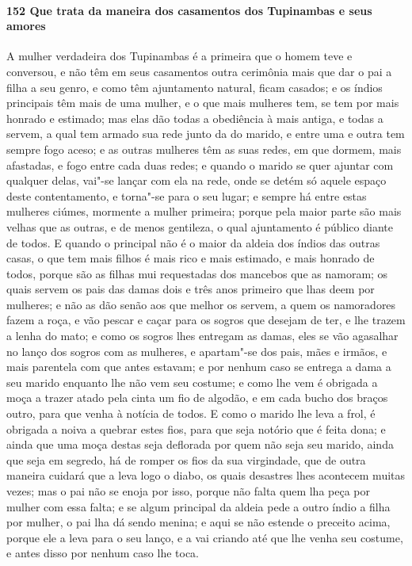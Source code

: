 \paragraph{152 Que trata da maneira dos casamentos dos Tupinambas e seus amores}

A mulher verdadeira dos Tupinambas é a primeira que o homem teve e conversou, e não têm em
seus casamentos outra cerimônia mais que dar o pai a filha a seu genro, e como têm
ajuntamento natural, ficam casados; e os índios principais têm mais de uma mulher, e o que
mais mulheres tem, se tem por mais honrado e estimado; mas elas dão todas a obediência à
mais antiga, e todas a servem, a qual tem armado sua rede junto da do marido, e entre uma
e outra tem sempre fogo aceso; e as outras mulheres têm as suas redes, em que dormem, mais
afastadas, e fogo entre cada duas redes; e quando o marido se quer ajuntar com qualquer
delas, vai"-se lançar com ela na rede, onde se detém só aquele espaço deste contentamento,
e torna"-se para o seu lugar; e sempre há entre estas mulheres ciúmes, mormente a mulher
primeira; porque pela maior parte são mais velhas que as outras, e de menos gentileza, o
qual ajuntamento é público diante de todos. E quando o principal não é o maior da aldeia
dos índios das outras casas, o que tem mais filhos é mais rico e mais estimado, e mais
honrado de todos, porque são as filhas mui requestadas dos mancebos que as namoram; os
quais servem os pais das damas dois e três anos primeiro que lhas deem por mulheres; e não
as dão senão aos que melhor os servem, a quem os namoradores fazem a roça, e vão pescar e
caçar para os sogros que desejam de ter, e lhe trazem a lenha do mato; e como os sogros
lhes entregam as damas, eles se vão agasalhar no lanço dos sogros com as mulheres, e
apartam"-se dos pais, mães e irmãos, e mais parentela com que antes estavam; e por nenhum
caso se entrega a dama a seu marido enquanto lhe não vem seu costume; e como lhe vem é
obrigada a moça a trazer atado pela cinta um fio de algodão, e em cada bucho dos braços
outro, para que venha à notícia de todos. E como o marido lhe leva a frol, é obrigada a
noiva a quebrar estes fios, para que seja notório que é feita dona; e ainda que uma moça
destas seja deflorada por quem não seja seu marido, ainda que seja em segredo, há de
romper os fios da sua virgindade, que de outra maneira cuidará que a leva logo o diabo, os
quais desastres lhes acontecem muitas vezes; mas o pai não se enoja por isso, porque não
falta quem lha peça por mulher com essa falta; e se algum principal da aldeia pede a outro
índio a filha por mulher, o pai lha dá sendo menina; e aqui se não estende o preceito
acima, porque ele a leva para o seu lanço, e a vai criando até que lhe venha seu costume,
e antes disso por nenhum caso lhe toca.

